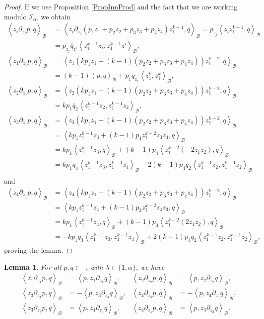 \documentclass{amsart}
\newtheorem{lemma}[theorem]{Lemma}
\numberwithin{theorem}{section}
\theoremstyle{definition}
\theoremstyle{remark}
\DeclareMathOperator{\Fock}{\mc F_\lambda}
\newcommand{\bfip}[1]{\left<{#1}\right>_\mathcal B}
\newcommand{\pt}[1]{\partial_{#1}}
\newcommand{\mc}[1]{\mathcal{#1}}
\newcommand{\ol}[1]{\overline{#1}}
\newcommand{\Ial}{\mc I_\alpha}
\begin{document}
\begin{proof}
If we use Proposition \ref{PropInnProd} and the fact that we are working modulo $\Ial$, we obtain
\begin{align*}
\bfip{z_i \pt {z_j} p, q} &= \bfip{z_i \pt {z_j} (p_1 {z_1}+p_2 {z_2}+p_3 z_3+p_4 {z_4})z_1^{k-1}, q} = p_{z_j}\bfip{z_iz_1^{k-1}, q}\\
&= p_{z_j}\overline{q}_{z^i}\bfip{z_1^{k-1}z_i,z_1^{k-1}z^i},\\
\bfip{z_1\pt {z_1} p, q} &= \bfip{{z_1} (k p_1 {z_1}+ (k-1)(p_2 {z_2}+p_3 z_3+p_4{z_4}))z_1^{k-2}, q}\\
&= (k-1)\bfip{p,q}+p_1\overline{q}_{z_1}\bfip{z_1^k,z_1^k},\\
\bfip{{z_2}\pt {z_1} p, q} &= \bfip{{z_2} (k p_1 {z_1}+ (k-1)(p_2 {z_2}+p_3 z_3+p_4{z_4}))z_1^{k-2}, q}\\
&= kp_1\ol q_2\bfip{z_1^{k-1}{z_2}, z_1^{k-1}{z_2}},\\
\bfip{z_3\pt {z_1} p, q} &= \bfip{z_3 (k p_1 {z_1}+ (k-1)(p_2 {z_2}+p_3 z_3+p_4{z_4}))z_1^{k-2}, q}\\
&= \bfip{k p_1 z_1^{k-1}z_3 + (k-1)p_4 z_1^{k-2}z_3{z_4}, q}\\
&= k p_1 \bfip{z_1^{k-1}z_3, q} + (k-1)p_4\bfip{z_1^{k-2}(-2{z_1}{z_2}), q}\\
&= k p_1\ol q_4\bfip{z_1^{k-1}z_3, z_1^{k-1}{z_4}}-2(k-1)p_4\ol q_2\bfip{z_1^{k-1}{z_2}, z_1^{k-1}{z_2}}\\
\end{align*}
and
\begin{align*}
\bfip{{z_4}\pt {z_1} p, q} &= \bfip{{z_4} (k p_1 {z_1}+ (k-1)(p_2 {z_2}+p_3 z_3+p_4{z_4}))z_1^{k-2}, q}\\
&= \bfip{k p_1 z_1^{k-1}{z_4} + (k-1)p_3 z_1^{k-2}{z_4} z_3, q}\\
&= k p_1 \bfip{z_1^{k-1}{z_4}, q} + (k-1)p_3\bfip{z_1^{k-2}(2{z_1}{z_2}), q}\\
&= -k p_1\ol q_3\bfip{z_1^{k-1}z_3, z_1^{k-1}{z_4}} + 2(k-1)p_3\ol q_2\bfip{z_1^{k-1}{z_2}, z_1^{k-1}{z_2}},
\end{align*}
proving the lemma.
\end{proof}

\begin{lemma}\label{LemSkewSymRho}
For all $p,q\in \Fock$, with $\lambda\in\{1,\alpha\}$, we have
\begin{align*}
\bfip{{z_1} \pt {z_1} p, q} &= \bfip{p, {z_1} \pt {z_1} q}, & \bfip{{z_2} \pt {z_2} p, q} &= \bfip{p, {z_2} \pt {z_2} q},\\
\bfip{z_3 \pt{z_4} p, q} &= -\bfip{p,{z_3} \pt {z_4} q}, & \bfip{{z_4} \pt{ z_3} p, q} &= -\bfip{p,{z_4} \pt {z_3} q},\\
\bfip{z_3 \pt {z_3} p, q} &= \bfip{p,{z_4} \pt{z_4} q}, & \bfip{{z_4} \pt{z_4} p, q} &= \bfip{p, z_3 \pt {z_3} q}.
\end{align*}
\end{lemma}
\end{document}
